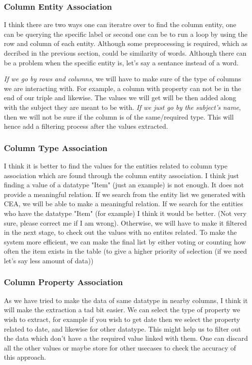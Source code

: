 \documentclass[runningheads]{llncs}
\begin{document}
\subsubsection*{Column Entity Association}
I think there are two ways one can iteratre over to find the column entity, one can be querying the specific label or second one can be to 
run a loop by using the row and column of each entity. Although some preprocessing is required, which as decribed in the previous section,
could be similarity of words. Although there can be a problem when the specific entity is, let's say a sentance instead of a word.

\textit{If we go by rows and columns}, we will have to make sure of the type of columns we are interacting with. For example, a column with property can
not be in the end of our triple and likewise. The values we will get will be then added along with the subject they are meant to be with. 
\textit{If we just go by the subject's name}, then we will not be sure if the column is of the same/required type. This will hence add a filtering 
process after the values extracted.

\subsubsection{Column Type Association}
I think it is better to find the values for the entities related to column type association which are found through the column entity association.
I think just finding a value of a datatype "Item" (just an example) is not enough. It does not provide a meaningful relation. If we search from 
the entity list we generated with CEA, we will be able to make a meaningful relation. If we search for the entities who have the datatype "Item"
(for example) I think it would be better. (Not very sure, please correct me if I am wrong). Otherwise, we will have to make it filtered in the next stage,
to check out the values with no entites related. To make the system more efficient, we can make the final list by either voting or counting how 
often the item exists in the table (to give a higher priority of selection (if we need let's say less amount of data)) 

\subsubsection*{Column Property Association}
As we have tried to make the data of same datatype in nearby columns, I think it will make the extraction a tad bit easier. We can select 
the type of property we wish to extract, for example if you wish to get date then we select the property related to date, and likewise for 
other datatype. This might help us to filter out the data which don't have a the required value linked with them. One can discard all the other
values or maybe store for other usecases to check the accuracy of this approach. 
\end{document}
